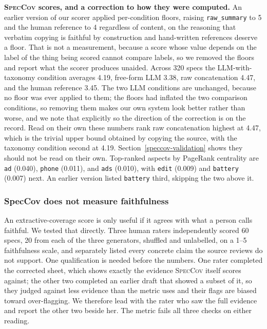 \documentclass[sigconf, anonymous]{acmart}
\begin{document}
\textbf{\textsc{SpecCov} scores, and a correction to how they were computed.} An earlier
version of our scorer applied per-condition floors, raising \texttt{raw\_summary} to 5 and the
human reference to 4 regardless of content, on the reasoning that verbatim copying is faithful by
construction and hand-written references deserve a floor. That is not a measurement, because a
score whose value depends on the label of the thing being scored cannot compare labels, so we
removed the floors and report what the scorer produces unaided. Across 320 specs the
LLM-with-taxonomy condition averages 4.19, free-form LLM 3.38, raw concatenation 4.47, and the
human reference 3.45. The two LLM conditions are unchanged, because no floor was ever applied to
them; the floors had inflated the two comparison conditions, so removing them makes our own
system look better rather than worse, and we note that explicitly so the direction of the
correction is on the record. Read on their own these numbers rank raw concatenation highest at 4.47, which is the trivial
upper bound obtained by copying the source, with the taxonomy condition second at 4.19. Section~\ref{speccov-validation} shows they should not be read on their own. Top-ranked aspects by PageRank centrality are
\texttt{ad} (0.040), \texttt{phone} (0.011), and \texttt{ads} (0.010), with \texttt{edit}
(0.009) and \texttt{battery} (0.007) next. An earlier version listed \texttt{battery} third,
skipping the two above it.

\subsubsection*{SpecCov does not measure faithfulness}\label{speccov-validation}
An extractive-coverage score is only useful if it agrees with what a person calls faithful. We
tested that directly. Three human raters independently scored 60 specs, 20 from each of the
three generators, shuffled and unlabelled, on a 1--5 faithfulness scale, and separately listed
every concrete claim the source reviews do not support. One qualification is needed before the
numbers. One rater completed the corrected sheet, which shows exactly the evidence
\textsc{SpecCov} itself scores against; the other two completed an earlier draft that showed a
subset of it, so they judged against less evidence than the metric uses and their flags are
biased toward over-flagging. We therefore lead with the rater who saw the full evidence and
report the other two beside her. The metric fails all three checks on either reading.
\end{document}
